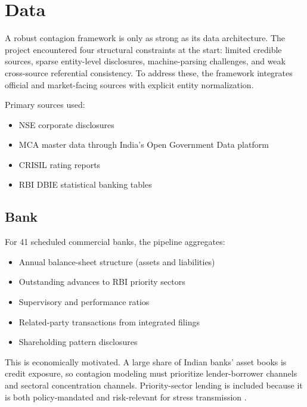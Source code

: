 
\section{Data}

A robust contagion framework is only as strong as its data architecture. The project encountered four structural constraints at the start: limited credible sources, sparse entity-level disclosures, machine-parsing challenges, and weak cross-source referential consistency. To address these, the framework integrates official and market-facing sources with explicit entity normalization.

Primary sources used:

\begin{itemize}
  \item NSE corporate disclosures \cite{ref1}
  \item MCA master data through India's Open Government Data platform \cite{ref2}
  \item CRISIL rating reports \cite{ref3}
  \item RBI DBIE statistical banking tables \cite{ref4}
\end{itemize}

\subsection{Bank}

For 41 scheduled commercial banks, the pipeline aggregates:

\begin{itemize}
  \item Annual balance-sheet structure (assets and liabilities) \cite{ref4}
  \item Outstanding advances to RBI priority sectors \cite{ref4}
  \item Supervisory and performance ratios \cite{ref4}
  \item Related-party transactions from integrated filings \cite{ref1}
  \item Shareholding pattern disclosures \cite{ref1}
\end{itemize}

This is economically motivated. A large share of Indian banks' asset books is credit exposure, so contagion modeling must prioritize lender-borrower channels and sectoral concentration channels. Priority-sector lending is included because it is both policy-mandated and risk-relevant for stress transmission \cite{ref5}.

